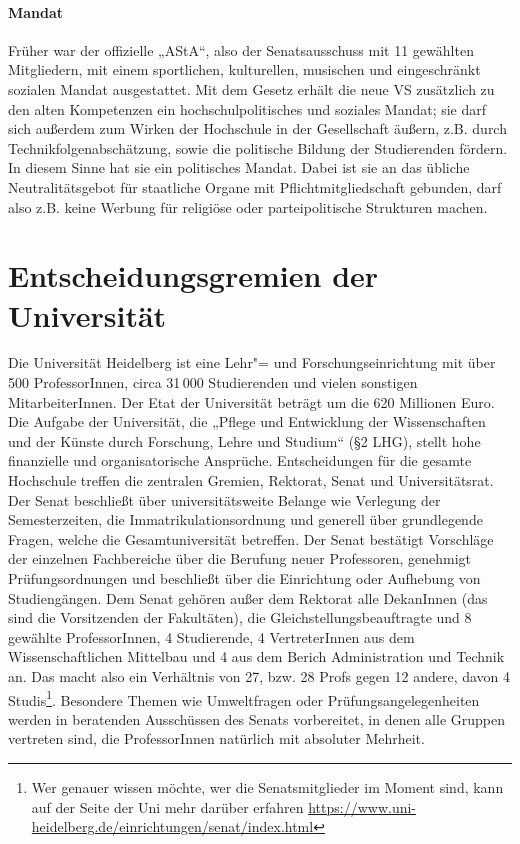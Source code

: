 \paragraph{Mandat}

Früher war der offizielle „AStA“, also der Senatsausschuss mit 11 gewählten Mitgliedern, mit einem sportlichen, kulturellen, musischen und eingeschränkt sozialen Mandat ausgestattet. Mit dem Gesetz erhält die neue VS zusätzlich zu den alten Kompetenzen ein hochschulpolitisches und soziales Mandat; sie darf sich außerdem zum Wirken der Hochschule in der Gesellschaft äußern, z.B. durch Technikfolgenabschätzung, sowie die politische Bildung der Studierenden fördern. In diesem Sinne hat sie ein politisches Mandat. Dabei ist sie an das übliche Neutralitätsgebot für staatliche Organe mit Pflichtmitgliedschaft gebunden, darf also z.B. keine Werbung für religiöse oder parteipolitische Strukturen machen.

\section{Entscheidungsgremien der Universität}

Die Universität Heidelberg ist eine Lehr"= und Forschungseinrichtung mit über 500 ProfessorInnen, circa 31\,000 Studierenden und vielen sonstigen MitarbeiterInnen. Der Etat der Universität beträgt um die 620 Millionen Euro. Die Aufgabe der Universität, die „Pflege und Entwicklung der Wissenschaften und der Künste durch Forschung, Lehre und Studium“ (§2 LHG), stellt hohe finanzielle und organisatorische Ansprüche. Entscheidungen für die gesamte Hochschule treffen die zentralen Gremien, Rektorat, Senat und Universitätsrat. Der Senat beschließt über universitätsweite Belange wie Verlegung der Semesterzeiten, die Immatrikulationsordnung und generell über grundlegende Fragen, welche die Gesamtuniversität betreffen. Der Senat bestätigt Vorschläge der einzelnen Fachbereiche über die Berufung neuer Professoren, genehmigt Prüfungsordnungen und beschließt über die Einrichtung oder Aufhebung von Studiengängen. Dem Senat gehören außer dem Rektorat alle DekanInnen (das sind die Vorsitzenden der Fakultäten), die Gleichstellungsbeauftragte und 8 gewählte ProfessorInnen, 4 Studierende, 4 VertreterInnen aus dem Wissenschaftlichen Mittelbau und 4 aus dem Berich Administration und Technik an. Das macht also ein Verhältnis von 27, bzw. 28 Profs gegen 12 andere, davon 4 Studis\footnote{Wer genauer wissen möchte, wer die Senatsmitglieder im Moment sind, kann auf der Seite der Uni mehr darüber erfahren \url{https://www.uni-heidelberg.de/einrichtungen/senat/index.html}}. Besondere Themen wie Umweltfragen oder Prüfungsangelegenheiten werden in beratenden Ausschüssen des Senats vorbereitet, in denen alle Gruppen vertreten sind, die ProfessorInnen natürlich mit absoluter Mehrheit. 

